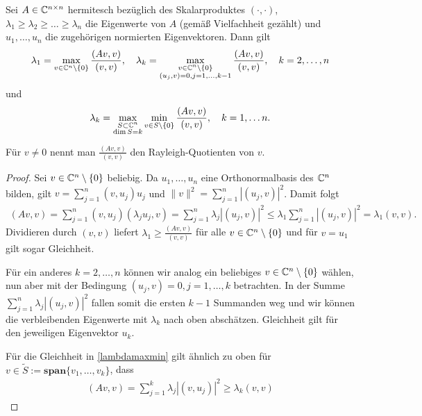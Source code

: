 \documentclass{article}
\begin{document}
\begin{theorem}
\begin{lemma} \label{Rayleigh}
	Sei $A \in \mathbb{C}^{n \times n}$ hermitesch bezüglich des Skalarproduktes $(\cdot, \cdot)$, $\lambda_1 \geq \lambda_2 \geq \dots \geq \lambda_n$ die Eigenwerte von $A$ (gemäß Vielfachheit gezählt) und $u_1, \dots, u_n$ die zugehörigen normierten Eigenvektoren. Dann gilt
	\begin{align}\label{lambdamax}
		\lambda_1 = \max_{v \in \mathbb{C}^n \setminus \{0\}} \frac{(Av,v)}{(v,v)}, \quad \lambda_k = \max_{\substack{v \in \mathbb{C}^n \setminus \{0\}\\
    (u_j,v) = 0, j= 1,\dots, k-1}} \frac{(Av,v)}{(v,v)}, \quad k= 2, \dots, n
	\end{align}
	und
	\begin{align}\label{lambdamaxmin}
		\lambda_k = \max_{\substack{S \subset \mathbb{C}^n\\
    \dim S = k}} \min_{v \in S \setminus \{0\}} \frac{(Av,v)}{(v,v)}, \quad k=1, \dots n.
	\end{align}

	Für $v \neq 0$ nennt man $\frac{(Av,v)}{(v,v)}$ den Rayleigh-Quotienten von $v$.
\end{lemma}

\begin{proof}
	Sei $v \in \mathbb{C}^n \setminus \{0\}$ beliebig. Da $u_1, \dots, u_n$ eine Orthonormalbasis des $\mathbb{C}^n$ bilden, gilt $ v = \sum_{j=1}^{n} (v,u_j) u_j$ und $\|v\|^2 = \sum_{j=1}^{n} |(u_j,v)|^2$. Damit folgt
	\begin{align*}
		(Av,v) = \sum_{j=1}^{n} (v,u_j) (\lambda_j u_j,v) = \sum_{j=1}^{n} \lambda_j |(u_j,v)|^2 \leq \lambda_1 \sum_{j=1}^{n} |(u_j,v)|^2 = \lambda_1 (v,v).
	\end{align*}
	Dividieren durch $(v,v)$ liefert $\lambda_1 \geq \frac{(Av,v)}{(v,v)}$ für alle $v \in \mathbb{C}^n \setminus \{0\}$ und für $v = u_1$ gilt sogar Gleichheit.

	Für ein anderes $k = 2,\dots,n$ können wir analog ein beliebiges $v \in \mathbb{C}^n \setminus \{0\}$ wählen, nun aber mit der Bedingung $(u_j,v) = 0, j=1,\dots,k$ betrachten. In der Summe $\sum_{j=1}^{n} \lambda_j |(u_j,v)|^2$ fallen somit die ersten $k-1$ Summanden weg und wir können die verbleibenden Eigenwerte mit $\lambda_k$ nach oben abschätzen. Gleichheit gilt für den jeweiligen Eigenvektor $u_k$.

	Für die Gleichheit in \ref{lambdamaxmin} gilt ähnlich zu oben für $v \in \tilde{S} := \textbf{span}\{v_1, \dots, v_k\}$, dass
	\begin{align*}
		(Av,v) = \sum_{j=1}^{k} \lambda_j |(v,u_j)|^2 \geq \lambda_k (v,v)
	\end{align*}


\end{proof}
\end{theorem}
\end{document}
